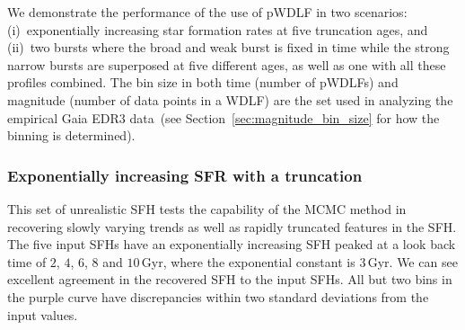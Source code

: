 \documentclass[fleqn,usenatbib]{mnras}
\begin{document}
We demonstrate the performance of the use of pWDLF in two scenarios:
(i)~exponentially increasing star formation rates at five truncation ages, and
(ii)~two bursts where the broad and weak burst is fixed in time while the strong
narrow bursts are superposed at five different ages, as well as one with all
these profiles combined. The bin size in both time (number of pWDLFs) and
magnitude (number of data points in a WDLF) are the set used in analyzing the
empirical Gaia EDR3 data~(see Section~\ref{sec:magnitude_bin_size} for how
the binning is determined).

\subsubsection*{Exponentially increasing SFR with a truncation}
This set of unrealistic SFH tests the capability of the MCMC method in
recovering slowly varying trends as well as rapidly truncated features in the
SFH. The five input SFHs have an exponentially increasing SFH peaked at a look
back time of $2$, $4$, $6$, $8$ and $10$\,Gyr, where the exponential constant
is $3$\,Gyr. We can see excellent agreement in the recovered SFH to the input
SFHs. All but two bins in the purple curve have discrepancies within two
standard deviations from the input values. 
\end{document}
